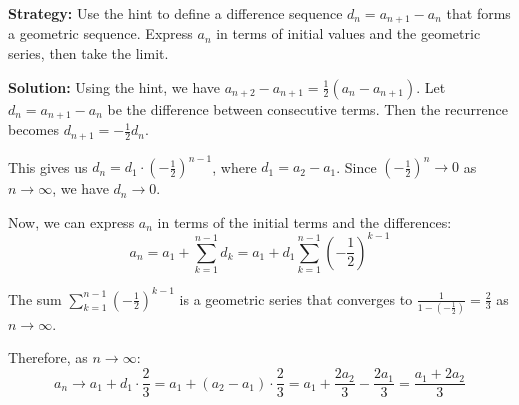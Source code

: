 \noindent\textbf{Strategy:} Use the hint to define a difference sequence $d_n = a_{n+1} - a_n$ that forms a geometric sequence. Express $a_n$ in terms of initial values and the geometric series, then take the limit.

\bigskip\noindent\textbf{Solution:}
Using the hint, we have $a_{n+2} - a_{n+1} = \frac{1}{2}(a_n - a_{n+1})$. Let $d_n = a_{n+1} - a_n$ be the difference between consecutive terms. Then the recurrence becomes $d_{n+1} = -\frac{1}{2}d_n$.

This gives us $d_n = d_1 \cdot \left(-\frac{1}{2}\right)^{n-1}$, where $d_1 = a_2 - a_1$. Since $\left(-\frac{1}{2}\right)^n \to 0$ as $n \to \infty$, we have $d_n \to 0$.

Now, we can express $a_n$ in terms of the initial terms and the differences:
\[
a_n = a_1 + \sum_{k=1}^{n-1} d_k = a_1 + d_1 \sum_{k=1}^{n-1} \left(-\frac{1}{2}\right)^{k-1}
\]

The sum $\sum_{k=1}^{n-1} \left(-\frac{1}{2}\right)^{k-1}$ is a geometric series that converges to $\frac{1}{1 - \left(-\frac{1}{2}\right)} = \frac{2}{3}$ as $n \to \infty$.

Therefore, as $n \to \infty$:
\[
a_n \to a_1 + d_1 \cdot \frac{2}{3} = a_1 + (a_2 - a_1) \cdot \frac{2}{3} = a_1 + \frac{2a_2}{3} - \frac{2a_1}{3} = \frac{a_1 + 2a_2}{3}
\]

